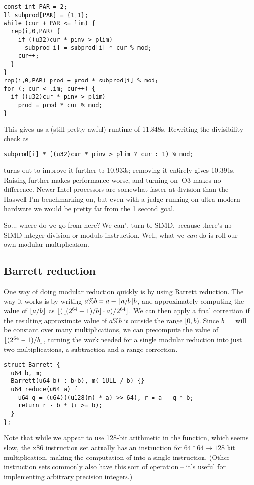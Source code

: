\begin{lstlisting}
const int PAR = 2;
ll subprod[PAR] = {1,1};
while (cur + PAR <= lim) {
  rep(i,0,PAR) {
    if ((u32)cur * pinv > plim)
      subprod[i] = subprod[i] * cur % mod;
    cur++;
  }
}
rep(i,0,PAR) prod = prod * subprod[i] % mod;
for (; cur < lim; cur++) {
  if ((u32)cur * pinv > plim)
    prod = prod * cur % mod;
}
\end{lstlisting}

This gives us a (still pretty awful) runtime of 11.848s.
Rewriting the divisibility check as
\begin{lstlisting}
subprod[i] * ((u32)cur * pinv > plim ? cur : 1) % mod;
\end{lstlisting}
turns out to improve it further to 10.933s; removing it entirely gives 10.391s.
Raising \verb@PAR@ further makes performance worse, and turning on -O3 makes no difference.
Newer Intel processors are somewhat faster at division than the Haswell I'm benchmarking on, but even with a judge running on ultra-modern hardware we would be pretty far from the 1 second goal.

So... where do we go from here?
We can't turn to SIMD, because there's no SIMD integer division or modulo instruction.
Well, what we \emph{can} do is roll our own modular multiplication.

\subsection{Barrett reduction}
One way of doing modular reduction quickly is by using Barrett reduction.
The way it works is by writing $a \% b = a - \lfloor a / b\rfloor b$, and approximately computing the value of $\lfloor a / b\rfloor$ as $\lfloor(\lfloor(2^{64} - 1) / b\rfloor \cdot a) / 2^{64}\rfloor$.
We can then apply a final correction if the resulting approximate value of $a \% b$ is outside the range $[0, b)$.
Since $b =$ \verb@mod@ will be constant over many multiplications, we can precompute the value of $\lfloor(2^{64} - 1) / b\rfloor$, turning the work needed for a single modular reduction into just two multiplications, a subtraction and a range correction.
\begin{lstlisting}
struct Barrett {
  u64 b, m;
  Barrett(u64 b) : b(b), m(-1ULL / b) {}
  u64 reduce(u64 a) {
    u64 q = (u64)((u128(m) * a) >> 64), r = a - q * b;
    return r - b * (r >= b);
  }
};
\end{lstlisting}

Note that while we appear to use 128-bit arithmetic in the \verb@reduce@ function, which seems slow, the x86 instruction set actually has an instruction for \mbox{$64*64\rightarrow128$} bit multiplication, making the computation of \verb@q@ into a single instruction.
(Other instruction sets commonly also have this sort of operation -- it's useful for implementing arbitrary precision integers.)

